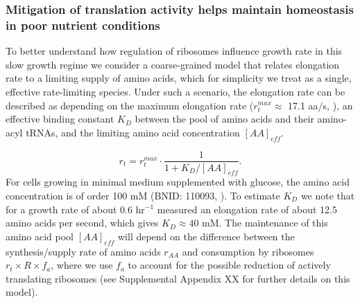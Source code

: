 \subsubsection{Mitigation of translation activity helps maintain homeostasis in
poor nutrient conditions}
To better understand how regulation of ribosomes influence growth rate in this
slow growth regime we consider a coarse-grained model that relates elongation
rate to a limiting supply of amino acids, which for simplicity we treat as a
single, effective rate-limiting species. Under such a scenario, the elongation
rate can be described as depending on the maximum elongation rate ($r_t^{max}
\approx$ 17.1 aa/s, \citep{dai2016, dai2018}), an effective binding constant
$K_D$ between the pool of amino acids and their amino-acyl tRNAs, and the limiting
amino acid concentration $[AA]_{eff}$.

\begin{equation}
r_t = r_t^{max} \cdot \frac{1}{1 + K_D / [AA]_{eff}}.
\label{eq:rate_Kd}
\end{equation}
For cells growing in minimal medium supplemented with glucose, the amino acid
concentration is of order 100 mM (BNID: 110093, \citep{milo2010, bennett2009}).
To estimate  $K_D$ we note that for a growth rate of about 0.6 hr$^{-1}$
\cite{dai2016} measured an elongation rate of about 12.5 amino acids per second,
which gives $K_D \approx 40$ mM. The maintenance of this amino acid pool
$[AA]_{eff}$ will depend on the difference between the synthesis/supply rate of
amino acids $r_{AA}$ and consumption by ribosomes $r_t \times R \times f_a$,
where we use $f_a$ to account for the possible reduction of actively translating
ribosomes (see Supplemental Appendix XX for further details on this model).


